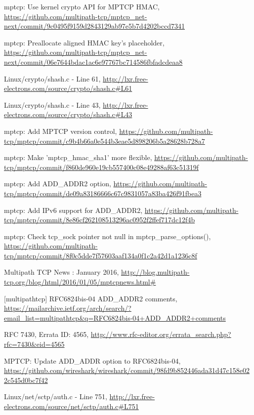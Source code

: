 \begin{thebibliography}{99}
mptcp: Use kernel crypto API for MPTCP HMAC, 
\url{https://github.com/multipath-tcp/mptcp_net-next/commit/9c0495f9159d2843129ab97e5b7d4202bccd7341} 

mptcp: Preallocate aligned HMAC key's placeholder, 
\url{https://github.com/multipath-tcp/mptcp_net-next/commit/06e7644bdac1ac6e97767bc714586fbfadcdeaa8} 

Linux/crypto/shash.c - Line 61,
\url{http://lxr.free-electrons.com/source/crypto/shash.c#L61}

Linux/crypto/shash.c - Line 43,
\url{http://lxr.free-electrons.com/source/crypto/shash.c#L43}

mptcp: Add MPTCP version control,
\url{https://github.com/multipath-tcp/mptcp/commit/c9b4b66a0e544b3eae5d898206b5a28628b728a7}

mptcp: Make 'mptcp\_hmac\_sha1' more flexible,
\url{https://github.com/multipath-tcp/mptcp/commit/f860de960e19cb557400c08e49288af63c51319f} 

mptcp: Add ADD\_ADDR2 option,
\url{https://github.com/multipath-tcp/mptcp/commit/de09a83186666c67c9831057a83ba426f91fbea3} 

mptcp: Add IPv6 support for ADD\_ADDR2, 
\url{https://github.com/multipath-tcp/mptcp/commit/8e86cf262108513296ac0952f2ffef717dc12f4b} 

mptcp: Check tcp\_sock pointer not null in mptcp\_parse\_options(), 
\url{https://github.com/multipath-tcp/mptcp/commit/8f0c5dde7f57603aaf134a0f1c2a42d1a1236c8f} 

Multipath TCP News : January 2016, 
\url{http://blog.multipath-tcp.org/blog/html/2016/01/05/mptcpnews.html#}

[multipathtcp] RFC6824bis-04 ADD\_ADDR2 comments, 
\url{https://mailarchive.ietf.org/arch/search/?email_list=multipathtcp&q=RFC6824bis-04+ADD_ADDR2+comments}

RFC 7430, Errata ID: 4565, 
\url{http://www.rfc-editor.org/errata_search.php?rfc=7430&eid=4565}

MPTCP: Update ADD\_ADDR option to RFC6824bis-04, 
\url{https://github.com/wireshark/wireshark/commit/98fd9b852446ada31d47c158e022c545d0bc7f42}

Linux/net/sctp/auth.c - Line 751, 
\url{http://lxr.free-electrons.com/source/net/sctp/auth.c#L751}


\end{thebibliography}
